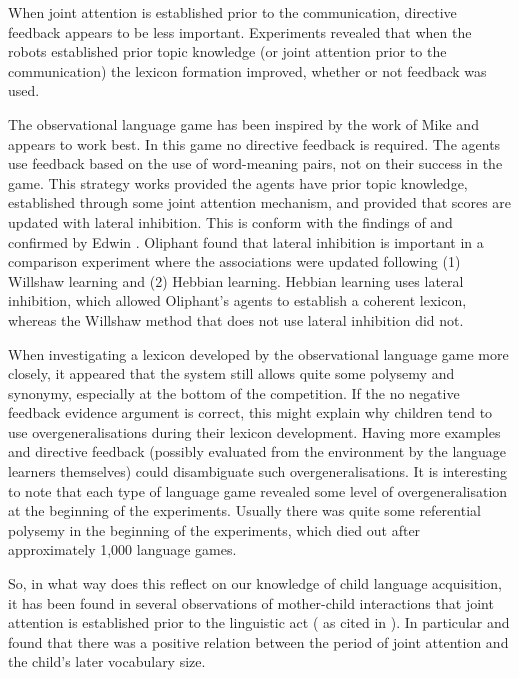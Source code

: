 When joint attention is established prior to the communication, directive feedback appears to be less important. Experiments revealed that when the robots established prior topic knowledge (or joint attention prior to the communication) the lexicon formation improved, whether or not feedback was used. 

The observational language game has been inspired by the work of Mike \citet{oliphant:1997} and appears to work best. In this game no directive feedback is required.  The agents use feedback based on the use of word-meaning pairs, not on their success in the game. This strategy works provided the agents have prior topic knowledge, established through some joint attention mechanism, and provided that scores are updated with lateral inhibition. This is conform with the findings of \citet{oliphant:1997,oliphant:1998} and confirmed by Edwin \citet{dejong:2000}. Oliphant found that lateral inhibition is important in a comparison experiment where the associations were updated following (1) Willshaw learning and (2) Hebbian learning. Hebbian learning uses lateral inhibition, which allowed Oliphant's agents to establish a coherent lexicon, whereas the Willshaw method  that does not use lateral inhibition did not.

When investigating a lexicon developed by the observational language game more closely, it appeared that the system still allows quite some polysemy and synonymy, especially at the bottom of the competition. If the no negative feedback evidence argument is correct, this might explain why children tend to use overgeneralisations during their lexicon development. Having more examples and directive feedback (possibly evaluated from the environment by the language learners themselves) could disambiguate such overgeneralisations. It is interesting to note that each type of language game revealed some level of overgeneralisation at the beginning of the experiments. Usually there was quite some referential polysemy in the beginning of the experiments, which died out after approximately 1,000 language games. 

So, in what way does this reflect on our knowledge of child language acquisition, it has been found in several observations of mother-child interactions that joint attention is established prior to the linguistic act (\citealt{schafferetal:1983,harrisetal:1983,harrisetal:1984,tomasellotodd:1983,tomaselloetal:1986} as cited in \citealt{barrett:1995}). In particular \citet{tomasellotodd:1983} and \citet{tomaselloetal:1986} found that there was a positive relation between the period of joint attention and the child's later vocabulary size.  

